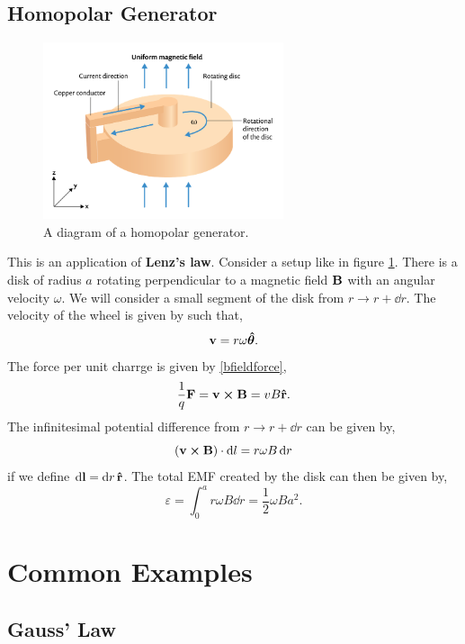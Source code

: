 \documentclass{book}
\begin{document}
\section{Homopolar Generator}
\begin{figure}
    \centering
    \includegraphics[width=200pt]{homopolar-generator-schematic.png}
    \caption{A diagram of a homopolar generator.}
    \label{fig:homopolar}
\end{figure}
This is an application of \textbf{Lenz's law}. Consider a setup like in figure \ref{fig:homopolar}. There is a disk of radius $a$ rotating perpendicular to a magnetic field $\vb{B}$ with an angular velocity $\omega$. We will consider a small segment of the disk from $r \to r + \dd{r}$. The velocity of the wheel is given by such that,
\begin{equation}
    \vb{v} = r\omega\vu*{\theta}.
\end{equation}
The force per unit charrge is given by \eqref{bfieldforce},
\begin{equation}
    \frac{1}{q}\vb{F} = \vb{v} \cross \vb{B} = vB\vu{r}.
\end{equation}
The infinitesimal potential difference from $r \to r + \dd{r}$ can be given by,
\begin{equation}
    (\vb{v}\cross\vb{B})\cdot\dd{l} = r\omega B\dd{r} 
\end{equation}
if we define $\dd{\vb{l}} = \dd{r}\vu{r}$. The total EMF created by the disk can then be given by,
\begin{equation}
    \varepsilon = \int_0^ar\omega B \dd{r} = \frac{1}{2}\omega B a^2.
\end{equation}

\chapter{Common Examples}
\section{Gauss' Law}
\end{document}
